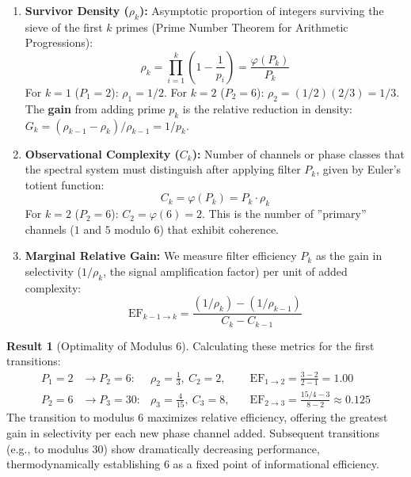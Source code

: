\documentclass[12pt, a4paper]{article}
\theoremstyle{plain}
\theoremstyle{definition}
\newtheorem{resultado}[teorema]{Result} %
\theoremstyle{remark}
\begin{document}
\begin{enumerate}
    \item \textbf{Survivor Density ($\rho_k$):} Asymptotic proportion of integers surviving the sieve of the first $k$ primes (Prime Number Theorem for Arithmetic Progressions):
    \[
    \rho_k = \prod_{i=1}^k \left(1 - \frac{1}{p_i}\right) = \frac{\varphi(P_k)}{P_k}
    \]
    For $k=1$ ($P_1=2$): $\rho_1 = 1/2$. For $k=2$ ($P_2=6$): $\rho_2 = (1/2)(2/3)=1/3$. The \textbf{gain} from adding prime $p_k$ is the relative reduction in density: $G_{k} = (\rho_{k-1} - \rho_k)/\rho_{k-1} = 1/p_k$.

    \item \textbf{Observational Complexity ($C_k$):} Number of channels or phase classes that the spectral system must distinguish after applying filter $P_k$, given by Euler's totient function:
    \[
    C_k = \varphi(P_k) = P_k \cdot \rho_k
    \]
    For $k=2$ ($P_2=6$): $C_2 = \varphi(6)=2$. This is the number of ''primary'' channels ($1$ and $5$ modulo $6$) that exhibit coherence.

    \item \textbf{Marginal Relative Gain:} We measure filter efficiency $P_k$ as the gain in selectivity ($1/\rho_k$, the signal amplification factor) per unit of added complexity:
    \[
    \mathrm{EF}_{k-1 \to k} = \frac{(1/\rho_k) - (1/\rho_{k-1})}{C_k - C_{k-1}}
    \]
\end{enumerate}

\begin{resultado}[Optimality of Modulus 6]
Calculating these metrics for the first transitions:
\begin{align*}
    P_1=2 &\rightarrow P_2=6: & \rho_2=\frac{1}{3},\ C_2=2, &\quad \mathrm{EF}_{1\to2} = \frac{3 - 2}{2 - 1} = \mathbf{1.00} \\
    P_2=6 &\rightarrow P_3=30: & \rho_3=\frac{4}{15},\ C_3=8, &\quad \mathrm{EF}_{2\to3} = \frac{15/4 - 3}{8 - 2} \approx \mathbf{0.125}
\end{align*}
The transition to modulus 6 maximizes relative efficiency, offering the greatest gain in selectivity per each new phase channel added. Subsequent transitions (e.g., to modulus 30) show dramatically decreasing performance, thermodynamically establishing 6 as a fixed point of informational efficiency.
\end{resultado}

\end{document}

